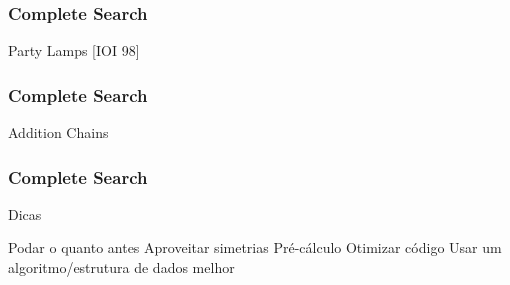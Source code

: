 \begin{frame}
\frametitle{Complete Search}
\begin{block}{Party Lamps [IOI 98]}
%
%
%
%
\end{block}
\end{frame}

\begin{frame}
\frametitle{Complete Search}
\begin{block}{Addition Chains}
%
\end{block}
\end{frame}

\begin{frame}
\frametitle{Complete Search}
\begin{block}{Dicas}
\begin{itemize}[<+->]
	\bitem Podar o quanto antes
	\bitem Aproveitar simetrias
	\bitem Pré-cálculo
	\bitem Otimizar código
	\bitem Usar um algoritmo/estrutura de dados melhor
\end{itemize}
\end{block}
\end{frame}

